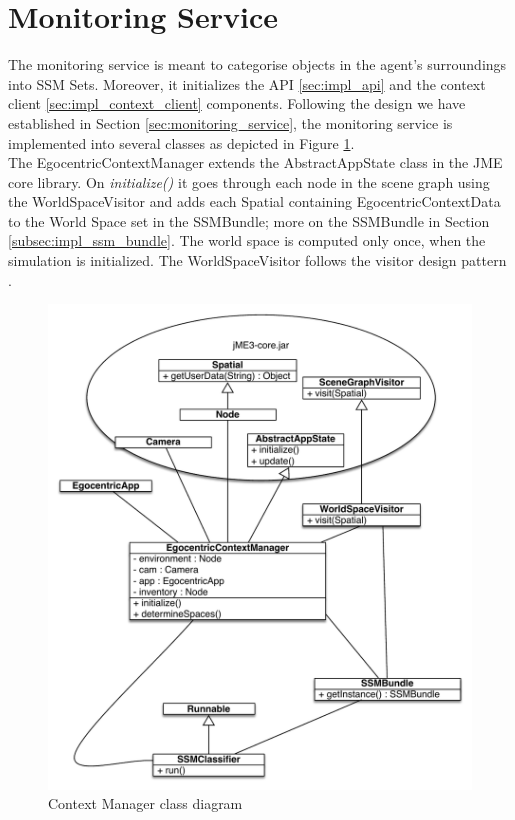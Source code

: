 \section{Monitoring Service} %
\label{sec:impl_monitoring_service}
The monitoring service is meant to categorise objects in the agent's surroundings into SSM Sets. Moreover, it initializes the API \ref{sec:impl_api} and the context client \ref{sec:impl_context_client} components. Following the design we have established in Section \ref{sec:monitoring_service}, the monitoring service is implemented into several classes as depicted in Figure \ref{fig:impl_monitoring_service}.\\

The EgocentricContextManager extends the AbstractAppState class in the JME core library. On \emph{initialize()} it goes through each node in the scene graph using the WorldSpaceVisitor and adds each Spatial containing EgocentricContextData to the World Space set in the SSMBundle; more on the SSMBundle in Section \ref{subsec:impl_ssm_bundle}. The world space is computed only once, when the simulation is initialized. The WorldSpaceVisitor follows the visitor design pattern \cite{gamma1994design}.\\
\begin{figure}[H]
	\centering
	\includegraphics[width=\linewidth]{gfx/Chapter4/monitoring_service}
	\caption{Context Manager class diagram}
	\label{fig:impl_monitoring_service}
\end{figure}

